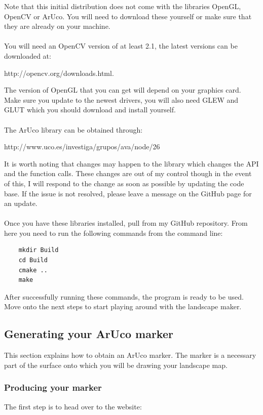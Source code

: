 \documentclass[11pt]{article}
\begin{document}
Note that this initial distribution does not come with the libraries
OpenGL, OpenCV or ArUco. You will need to download these yourself or make 
sure that they are already on your machine.\\
\\
You will need an OpenCV version of at least 2.1, the latest versions can
be downloaded at:
	\begin{center}
		http://opencv.org/downloads.html.
	\end{center} 
The version of OpenGL that you can get will depend on your graphics card.
Make sure you update to the newest drivers, you will also need GLEW and GLUT
which you should download and install yourself.\\
\\
The ArUco library can be obtained through:
	\begin{center}
		http://www.uco.es/investiga/grupos/ava/node/26	
	\end{center}
It is worth noting that changes may happen to the library which changes the
API and the function calls. These changes are out of my control though
in the event of this, I will respond to the change as soon as 
possible by updating the code base. If the issue is not resolved,
please leave a message on the GitHub page for an update.\\
\\
Once you have these libraries installed, pull from my GitHub 
repository. From here you need to run the following commands from the
command line:

\begin{verbatim}
	mkdir Build
	cd Build
	cmake ..
	make
\end{verbatim}

After successfully running these commands, the program is ready to be used.
Move onto the next steps to start playing around with the landscape maker.

\newpage
\subsection{Generating your ArUco marker}
This section explains how to obtain an ArUco marker. The marker is 
a necessary part of the surface onto which you will be drawing your 
landscape map. 

\subsubsection*{Producing your marker}
The first step is to head over to the website:
\end{document}

